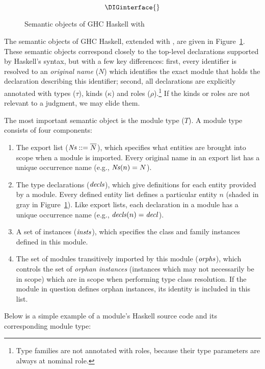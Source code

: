 \begin{figure}
\[ \DIGinterface{} \]
\caption{Semantic objects of GHC Haskell with \Backpack{}}
\label{fig:semantic-objects}
\end{figure}

The semantic objects of GHC Haskell, extended with \Backpack{}, are
given in Figure~\ref{fig:semantic-objects}.  These semantic objects
correspond closely to the top-level declarations supported by
Haskell's syntax, but with a few key differences: first, every
identifier is resolved to an \emph{original name} ($N$) which identifies
the exact module that holds the declaration describing this identifier;
second, all declarations are explicitly annotated with types ($\tau$), kinds ($\kappa$) and
roles ($\rho$).\footnote{Type families are not annotated with roles, because their
type parameters are always at nominal role.}  If the kinds or roles are not
relevant to a judgment, we may elide them.

The most important semantic object is the module type ($T$).  A module
type consists of four components:

\begin{enumerate}

    \item The export list ($\mathit{Ns} ::= \overline{N}$), which
    specifies what entities are brought into scope when a module is
    imported.  Every original name in an export list has a unique
    occurrence name (e.g., $\mathit{Ns}(n) = N$).

    \item The type declarations ($\mathit{decls}$), which give
    definitions for each entity provided by a module.  Every defined
    entity list defines a particular entity $n$ (shaded in gray
    in Figure~\ref{fig:semantic-objects}).  Like export lists,
    each declaration in a module has a unique occurrence name
    (e.g., $\mathit{decls}(n) = \mathit{decl}$).

    \item A set of instances ($\mathit{insts}$), which specifies the class
    and family instances defined in this module.

    \item The set of modules transitively imported by this module
    ($\mathit{orphs}$), which controls the set of \emph{orphan instances}
    (instances which may not necessarily be in scope) which are in scope
    when performing type class resolution.  If the module in question
    defines orphan instances, its identity is included in this list.

\end{enumerate}
%
Below is a simple example of a module's Haskell source code and its
corresponding module type:

